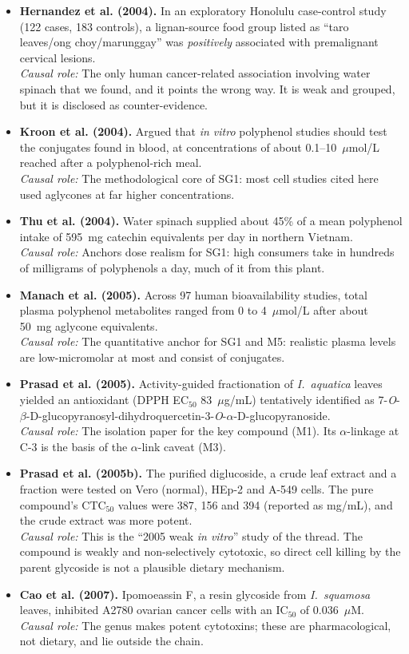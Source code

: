 \documentclass[11pt,a4paper]{article}
\newenvironment{litlist}{\begin{itemize}[leftmargin=2.6em,labelwidth=2.2em,labelsep=0.4em,align=left,itemsep=5pt,topsep=4pt]}{\end{itemize}}
\newcommand{\litentry}[4]{\item[\cite{#1}] \textbf{\color{navy}#2.} #3\\[1pt]
  {\color{teal}\textit{Causal role:}} #4}
\newcommand{\Ia}{\emph{I.~aquatica}}
\newcommand{\DQG}{7-\emph{O}-$\beta$-D-glucopyranosyl-dihydroquercetin-3-\emph{O}-$\alpha$-D-glucopyranoside}
\begin{document}
\begin{litlist}
\litentry{hernandez2004}{Hernandez et al. (2004)}{In an exploratory Honolulu case-control study (122 cases, 183 controls), a lignan-source food group listed as ``taro leaves/ong choy/marunggay'' was \emph{positively} associated with premalignant cervical lesions.}{The only human cancer-related association involving water spinach that we found, and it points the wrong way. It is weak and grouped, but it is disclosed as counter-evidence.}

\litentry{kroon2004}{Kroon et al. (2004)}{Argued that \emph{in vitro} polyphenol studies should test the conjugates found in blood, at concentrations of about 0.1--10~$\mu$mol/L reached after a polyphenol-rich meal.}{The methodological core of SG1: most cell studies cited here used aglycones at far higher concentrations.}

\litentry{thu2004}{Thu et al. (2004)}{Water spinach supplied about 45\% of a mean polyphenol intake of 595~mg catechin equivalents per day in northern Vietnam.}{Anchors dose realism for SG1: high consumers take in hundreds of milligrams of polyphenols a day, much of it from this plant.}

\litentry{manach2005}{Manach et al. (2005)}{Across 97 human bioavailability studies, total plasma polyphenol metabolites ranged from 0 to 4~$\mu$mol/L after about 50~mg aglycone equivalents.}{The quantitative anchor for SG1 and M5: realistic plasma levels are low-micromolar at most and consist of conjugates.}

\litentry{prasad2005}{Prasad et al. (2005)}{Activity-guided fractionation of \Ia{} leaves yielded an antioxidant (DPPH EC$_{50}$ 83~$\mu$g/mL) tentatively identified as \DQG.}{The isolation paper for the key compound (M1). Its $\alpha$-linkage at C-3 is the basis of the $\alpha$-link caveat (M3).}

\litentry{prasad2005b}{Prasad et al. (2005b)}{The purified diglucoside, a crude leaf extract and a fraction were tested on Vero (normal), HEp-2 and A-549 cells. The pure compound's CTC$_{50}$ values were 387, 156 and 394 (reported as mg/mL), and the crude extract was more potent.}{This is the ``2005 weak \emph{in vitro}'' study of the thread. The compound is weakly and non-selectively cytotoxic, so direct cell killing by the parent glycoside is not a plausible dietary mechanism.}

\litentry{cao2007}{Cao et al. (2007)}{Ipomoeassin F, a resin glycoside from \emph{I.~squamosa} leaves, inhibited A2780 ovarian cancer cells with an IC$_{50}$ of 0.036~$\mu$M.}{The genus makes potent cytotoxins; these are pharmacological, not dietary, and lie outside the chain.}


\end{litlist}
\end{document}
